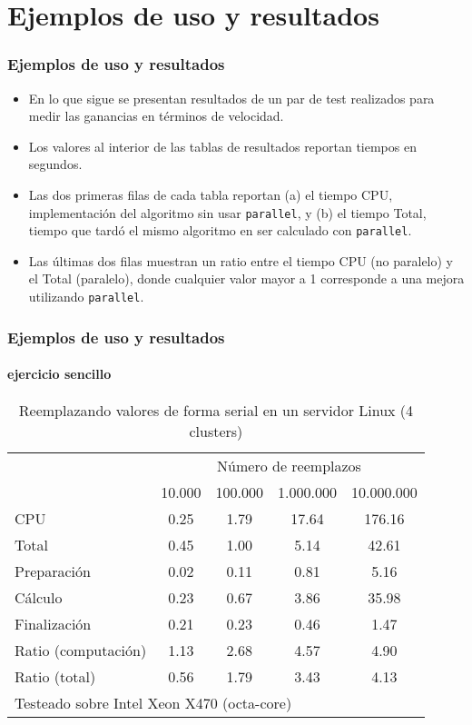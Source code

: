 \documentclass{beamer}
\def\unix1{Intel Xeon X470 (octa-core)}
\begin{document}
\section{Ejemplos de uso y resultados}

\begin{frame}
\frametitle{Ejemplos de uso y resultados}

\begin{itemize}
\item En lo que sigue se presentan resultados de un par de test realizados para medir las ganancias en t\'erminos de velocidad.
\item Los valores al interior de las tablas de resultados reportan tiempos en segundos.
\item Las dos primeras filas de cada tabla reportan (a) el tiempo CPU, implementaci\'on del algoritmo sin usar {\tt parallel}, y (b) el tiempo Total, tiempo que tard\'o el mismo algoritmo en ser calculado con {\tt parallel}.
\item Las \'ultimas dos filas muestran un ratio entre el tiempo CPU (no paralelo) y el Total (paralelo), donde cualquier valor mayor a 1 corresponde a una mejora utilizando {\tt parallel}.
\end{itemize}

\end{frame}


\begin{frame}
\frametitle{Ejemplos de uso y resultados}
\framesubtitle{ejercicio sencillo}

\begin{table}[!h]
\centering
\caption{Reemplazando valores de forma serial en un servidor Linux (4 clusters)\label{tab:serialreplace_linux}}
\begin{tabular}{l*{4}{c}}\hline
& \multicolumn{4}{c}{N\'umero de reemplazos} \\
& 10.000 &           100.000 &          1.000.000 &         10.000.000 \\ \hline
CPU &     0.25 &      1.79 &     17.64 &    176.16 \\
Total &     0.45 &      1.00 &      5.14 &     42.61 \\
\hspace{2mm} Preparaci\'on &     0.02 &      0.11 &      0.81 &      5.16 \\
\hspace{2mm} C\'alculo &     0.23 &      0.67 &      3.86 &     35.98 \\
\hspace{2mm} Finalizaci\'on &     0.21 &      0.23 &      0.46 &      1.47 \\
\hline Ratio (computaci\'on) &     1.13 &      2.68 &      4.57 &      4.90 \\
Ratio (total) &     0.56 &      1.79 &      3.43 &      4.13 \\
\hline
\multicolumn{5}{l}{\footnotesize Testeado sobre \unix1}
\end{tabular}
\end{table}

\end{frame}
\end{document}
